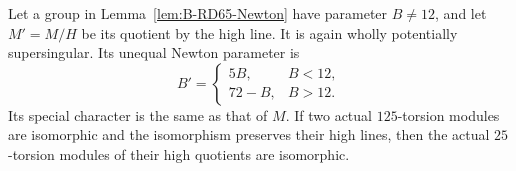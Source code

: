 \begin{lemma}
\label{lem:B-RD65-quotient}
Let a group in Lemma~\ref{lem:B-RD65-Newton} have parameter $B\ne12$,
and let $M'=M/H$ be its quotient by the high line. It is again wholly
potentially supersingular. Its unequal Newton parameter is
\[
 B'=\begin{cases}5B,&B<12,\\72-B,&B>12.\end{cases}      \tag{B-RD65.3}
\]
Its special character is the same as that of $M$.
If two actual $125$-torsion modules are isomorphic and the isomorphism
preserves their high lines, then the actual $25$-torsion modules of
their high quotients are isomorphic.
\end{lemma}
